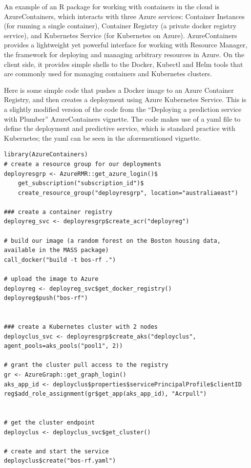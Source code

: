 An example of an R package for working with containers in the cloud is
AzureContainers, which interacts with three Azure services: Container
Instances (for running a single container), Container Registry (a
private docker registry service), and Kubernetes Service (for Kubernetes
on Azure). AzureContainers provides a lightweight yet powerful interface
for working with Resource Manager, the framework for deploying and
managing arbitrary resources in Azure. On the client side, it provides
simple shells to the Docker, Kubectl and Helm tools that are commonly
used for managing containers and Kubernetes clusters.

Here is some simple code that pushes a Docker image to an Azure
Container Registry, and then creates a deployment using Azure Kubernetes
Service. This is a slightly modified version of the code from the
``Deploying a prediction service with Plumber'' AzureContainers
vignette. The code makes use of a yaml file to define the deployment and
predictive service, which is standard practice with Kubernetes; the yaml
can be seen in the aforementioned vignette.

\begin{verbatim}
library(AzureContainers)
# create a resource group for our deployments
deployresgrp <- AzureRMR::get_azure_login()$
    get_subscription("subscription_id")$
    create_resource_group("deployresgrp", location="australiaeast")

### create a container registry
deployreg_svc <- deployresgrp$create_acr("deployreg")

# build our image (a random forest on the Boston housing data, available in the MASS package)
call_docker("build -t bos-rf .")

# upload the image to Azure
deployreg <- deployreg_svc$get_docker_registry()
deployreg$push("bos-rf")


### create a Kubernetes cluster with 2 nodes
deployclus_svc <- deployresgrp$create_aks("deployclus", agent_pools=aks_pools("pool1", 2))

# grant the cluster pull access to the registry
gr <- AzureGraph::get_graph_login()
aks_app_id <- deployclus$properties$servicePrincipalProfile$clientID
reg$add_role_assignment(gr$get_app(aks_app_id), "Acrpull")


# get the cluster endpoint
deployclus <- deployclus_svc$get_cluster()

# create and start the service
deployclus$create("bos-rf.yaml")
\end{verbatim}


